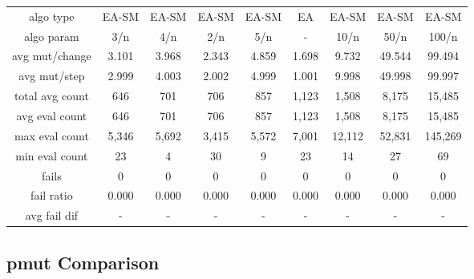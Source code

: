 \begin{tabular}[h]{ccccccccc}
algo type&          EA-SM&   EA-SM&   EA-SM&   EA-SM&      EA&   EA-SM&   EA-SM&   EA-SM\\
algo param&           3/n&     4/n&     2/n&     5/n&       -&    10/n&    50/n&   100/n\\
avg mut/change&     3.101&   3.968&   2.343&   4.859&   1.698&   9.732&  49.544&  99.494\\
avg mut/step&       2.999&   4.003&   2.002&   4.999&   1.001&   9.998&  49.998&  99.997\\
\hline
total avg count&      646&     701&     706&     857&   1,123&   1,508&   8,175&  15,485\\
avg eval count&       646&     701&     706&     857&   1,123&   1,508&   8,175&  15,485\\
max eval count&     5,346&   5,692&   3,415&   5,572&   7,001&  12,112&  52,831& 145,269\\
min eval count&        23&       4&      30&       9&      23&      14&      27&      69\\
\hline
fails&                  0&       0&       0&       0&       0&       0&       0&       0\\
fail ratio&         0.000&   0.000&   0.000&   0.000&   0.000&   0.000&   0.000&   0.000\\
avg fail dif&           -&       -&       -&       -&       -&       -&       -&       -\\
\end{tabular}


\subsection{pmut Comparison}


